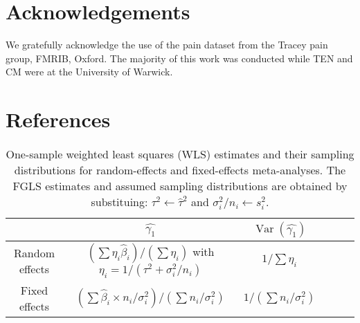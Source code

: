\documentclass[preprint]{elsarticle}
\DeclareMathOperator{\Var}{Var}
\newcommand{\effectvector}{\hat\beta}
\newcommand{\effect}[1][i]{\effectvector_{#1}}
\newcommand{\vareffect}[1][i]{s^2_{#1}}
\newcommand{\metaanalyticeffect}[1][i]{\gamma_{#1}}
\newcommand{\varBetween}{\tau^2}
\newcommand{\estvarBetween}{\hat\tau^2}
\newcommand{\nSubjects}[1][i]{n_{#1}}
\newcommand{\varWithin}[1][i]{\sigma^2_{#1}}
\newcommand{\varWithinConInv}[1][i]{\nSubjects[#1] / \sigma^2_{#1}}
\newcommand{\beginsupplement}{%
        \setcounter{table}{0}
        \renewcommand{\thetable}{S\arabic{table}}%
        \setcounter{figure}{0}
        \renewcommand{\thefigure}{S\arabic{figure}}%
     }
\begin{document}
\section{Acknowledgements}
We gratefully acknowledge the use of the pain dataset from the Tracey pain group, FMRIB, Oxford. The majority of this work was conducted while TEN and CM were at the University of Warwick.

%

\section{References}



\beginsupplement

\begin{table*}[h]
\begin{center}
\setlength{\tabcolsep}{3pt}
\begin{tabular}{cccccl}
				& $\hat{\metaanalyticeffect[1]}$ & $\Var(\hat{\metaanalyticeffect[1]})$ \\
\hline						
Random effects 		& $ \left( \sum \eta_i \effect \right) / \left( \sum \eta_i \right)$ with $\eta_i = 1/(\varBetween + \varWithin/\nSubjects)$ & $1/\sum \eta_i$ \\
Fixed effects 		& $ \left( \sum \effect \times \varWithinConInv \right) / \left(\sum \varWithinConInv \right)$ & $1/(\sum \varWithinConInv)$\\
\hline 
\end{tabular}
\end{center}
\caption{One-sample weighted least squares (WLS) estimates and their sampling distributions for random-effects and fixed-effects meta-analyses. The FGLS estimates and assumed sampling distributions are obtained by substituing: $\varBetween \leftarrow \estvarBetween$ and $\varWithin/\nSubjects \leftarrow \vareffect$.}
\label{table:estimates_wls_test1}
\end{table*}
\end{document}
